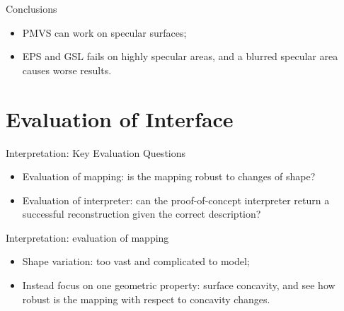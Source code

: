 \documentclass[10pt]{beamer}
\begin{document}
\begin{frame}{Conclusions}

\begin{itemize}
\item PMVS can work on specular surfaces;
\item EPS and GSL fails on highly specular areas, and a blurred specular area causes worse results.
\end{itemize}

\end{frame}

\section{Evaluation of Interface}
\begin{frame}{Interpretation: Key Evaluation Questions}

\begin{itemize}
\item Evaluation of mapping: is the mapping robust to changes of shape?
\item Evaluation of interpreter: can the proof-of-concept interpreter return a successful reconstruction given the correct description?
\end{itemize}

\end{frame}

\begin{frame}{Interpretation: evaluation of mapping}

\begin{itemize}
\item Shape variation: too vast and complicated to model;
\item Instead focus on one geometric property: surface concavity, and see how robust is the mapping with respect to concavity changes.
\end{itemize}

\end{frame}
\end{document}
